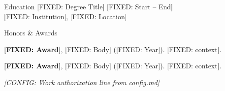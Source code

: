 \documentclass{resume}
\begin{document}

\begin{rSection}{Education}
{[FIXED: Degree Title]} \hfill {\textcolor{black!60}{[FIXED: Start -- End]}}\\
{[FIXED: Institution]}, [FIXED: Location]
\end{rSection}
\vspace{-0.15cm}


\begin{rSection2}{Honors \& Awards}
\item \textbf{[FIXED: Award]}, [FIXED: Body] ([FIXED: Year]). [FIXED: context].
\item \textbf{[FIXED: Award]}, [FIXED: Body] ([FIXED: Year]). [FIXED: context].
\end{rSection2}
\vspace{-0.1cm}


\begin{center}
\vspace{0.15cm}
\textit{[CONFIG: Work authorization line from config.md]}
\end{center}
\end{document}
